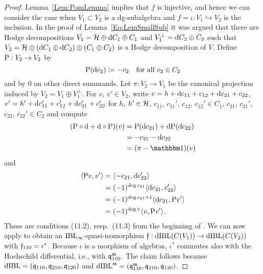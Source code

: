 \documentclass[\MainFolder/Text.tex]{subfiles}
\begin{document}
\begin{proof}
Lemma~\ref{Lem:PomLemma} implies that $f$ is injective, and hence we can consider the case when $V_1\subset V_2$ is a dg-subalgebra and $f=\iota: V_1 \hookrightarrow V_2$ is the inclusion.
In the proof of Lemma~\ref{Eq:LemSmallSub} it was argued that there are Hodge decompositions $V_1 = \mathcal{H} \oplus \mathrm{d} C_1 \oplus C_1$ and $V_1^\perp = \mathrm{d} C_2 \oplus C_2$ such that $V_2 = \mathcal{H} \oplus (\mathrm{d} C_1 \oplus \mathrm{d} C_2) \oplus (C_1 \oplus C_2)$ is a Hodge decomposition of $V$.
Define $\mathrm{P}: V_2 \rightarrow V_2$ by
\[
 \mathrm{P}(\mathrm{d} c_2) \coloneqq - c_2\quad\text{for all }c_2\in C_2
\]
and by $0$ on other direct summands.
Let $\pi: V_2 \rightarrow V_1$ be the canonical projection induced by $V_2 = V_1 \oplus V_1^\perp$.
For $v$, $v'\in V_2$, write $v = h + \mathrm{d} c_{11} + c_{12} + \mathrm{d} c_{21} + c_{22}$, $v'=h' + \mathrm{d} c_{11}' + c_{12}' + \mathrm{d} c_{21}' + c_{22}'$ for $h$, $h'\in \mathcal{H}$, $c_{11}$, $c_{11}'$, $c_{12}$, $c_{12}'\in C_1$, $c_{21}$, $c_{21}'$, $c_{22}$, $c_{22}'\in C_2$ and compute
\begin{align*}
 (\Prpg \circ \Dd + \Dd\circ\Prpg)(v) &= \Prpg(\Dd c_{21}) + \Dd\Prpg(\Dd c_{22}) \\
 & = - c_{21} - \Dd c_{22} \\
 & = (\pi - \Id)(v)
\end{align*}
and
\begin{align*}
	\langle \mathrm{P} v, v' \rangle &= \langle - c_{21},\mathrm{d} c_{22}'\rangle \\
	& = (-1)^{\deg c_{21}} \langle \mathrm{d} c_{21}, c_{22}' \rangle \\
	& = (-1)^{\deg c_{21} + 1} \langle \mathrm{d} c_{21}, \mathrm{P} v' \rangle \\
	& = (-1)^{\deg v} \langle v, \mathrm{P} v' \rangle.
\end{align*}
These are conditions (11.2), resp.~(11.3) from the beginning of \cite[Section~11]{Cieliebak2015}.
We can now apply \cite[Theorem~11.3]{Cieliebak2015} to obtain an $\mathrm{IBL}_\infty$-quasi-isomorphism $\mathfrak{f}: \mathrm{dIBL}(C(V_1)) \rightarrow \mathrm{dIBL}(C(V_2))$ with $\mathfrak{f}_{110} = \iota^*$.
Because $\iota$ is a morphism of algebras, $\iota^*$ commutes also with the Hochschild differential, i.e., with $\mathfrak{q}_{110}^{\mathfrak{m}}$.
The claim follows because $\mathrm{dIBL} = (\mathfrak{q}_{110},\mathfrak{q}_{210},\mathfrak{q}_{120})$ and $\mathrm{dIBL}^{\mathfrak{m}} = (\mathfrak{q}_{110}^{\mathfrak{m}},\mathfrak{q}_{210},\mathfrak{q}_{120})$. 
\end{proof}
\end{document}
